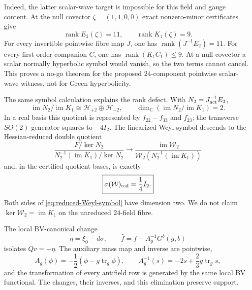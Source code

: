 \documentclass[11pt]{article}
\theoremstyle{definition}
\theoremstyle{remark}
\newcommand{\C}{\mathbb C}
\newcommand{\W}{\mathcal W}
\newcommand{\cH}{\mathcal H}
\newcommand{\im}{\operatorname{im}}
\newcommand{\rank}{\operatorname{rank}}
\begin{document}
Indeed, the latter scalar-wave target is impossible for this field and gauge
content.  At the null covector $\zeta=(1,1,0,0)$ exact nonzero-minor
certificates give
\begin{equation}\label{eq:null-rank-no-go}
 \boxed{\rank E_2(\zeta)=11,\qquad \rank K_1(\zeta)=9.}
\end{equation}
For every invertible pointwise fibre map $J$, one has
$\rank(J^{-1}E_2)=11$.  For every first-order companion $C$, one has
$\rank(K_1C_1)\leq9$.  At a null covector a scalar normally hyperbolic symbol
would vanish, so the two terms cannot cancel.  This proves a no-go theorem
for the proposed $24$-component pointwise scalar-wave witness, not for Green
hyperbolicity.

The same symbol calculation explains the rank defect.  With
$N_2=J_{\rm act}^{-1}E_2$,
\begin{equation}\label{eq:helicity-two-symbol-quotient}
 \im N_2/\im K_1\cong\cH_{+2}\oplus\cH_{-2},
 \qquad \dim_\C(\im N_2/\im K_1)=2.
\end{equation}
In a real basis this quotient is represented by $f_{22}-f_{33}$ and
$f_{23}$; the transverse $SO(2)$ generator squares to $-4I_2$.  The
linearized Weyl symbol descends to the Hessian-reduced double quotient
\begin{equation}\label{eq:reduced-Weyl-symbol}
 \frac{F/\ker N_2}{N_2^{-1}(\im K_1)/\ker N_2}
 \longrightarrow
 \frac{\im\W_2}{\W_2(N_2^{-1}(\im K_1))}
\end{equation}
and, in the certified quotient bases, is exactly
\begin{equation}
 \boxed{\sigma(\W)_{\rm red}=\frac14I_2.}
\end{equation}
Both sides of \eqref{eq:reduced-Weyl-symbol} have dimension two.  We do not
claim $\ker\W_2=\im K_1$ on the unreduced $24$-field fibre.

The local BV-canonical change
\begin{equation}
 \eta=\xi_0-d\sigma,\qquad
 \widehat f=f-A_g^{-1}G^b(g,b)
\end{equation}
isolates $Qv=-\eta$.  The auxiliary mass map and inverse are pointwise,
\begin{equation}
 A_g(\phi)=-\frac12(\phi-g\operatorname{tr}_g\phi),\qquad
 A_g^{-1}(s)=-2s+\frac23g\operatorname{tr}_g s,
\end{equation}
and the transformation of every antifield row is generated by the same
local BV functional.  The changes, their inverses, and this elimination
preserve support.
\end{document}
